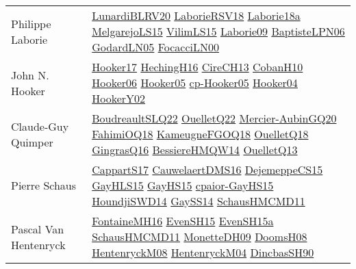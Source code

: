 {\begin{longtable}{p{4cm}p{20cm}}
Philippe Laborie & \href{articles/LunardiBLRV20.pdf}{LunardiBLRV20}\cite{LunardiBLRV20} \href{articles/LaborieRSV18.pdf}{LaborieRSV18}\cite{LaborieRSV18} \href{papers/Laborie18a.pdf}{Laborie18a}\cite{Laborie18a} \href{papers/MelgarejoLS15.pdf}{MelgarejoLS15}\cite{MelgarejoLS15} \href{papers/VilimLS15.pdf}{VilimLS15}\cite{VilimLS15} \href{papers/Laborie09.pdf}{Laborie09}\cite{Laborie09} \href{}{BaptisteLPN06}\cite{BaptisteLPN06} \href{}{GodardLN05}\cite{GodardLN05} \href{papers/FocacciLN00.pdf}{FocacciLN00}\cite{FocacciLN00} \\
John N. Hooker & \href{papers/Hooker17.pdf}{Hooker17}\cite{Hooker17} \href{papers/HechingH16.pdf}{HechingH16}\cite{HechingH16} \href{papers/CireCH13.pdf}{CireCH13}\cite{CireCH13} \href{papers/CobanH10.pdf}{CobanH10}\cite{CobanH10} \href{articles/Hooker06.pdf}{Hooker06}\cite{Hooker06} \href{articles/Hooker05.pdf}{Hooker05}\cite{Hooker05} \href{papers/cp-Hooker05.pdf}{cp-Hooker05}\cite{cp-Hooker05} \href{papers/Hooker04.pdf}{Hooker04}\cite{Hooker04} \href{papers/HookerY02.pdf}{HookerY02}\cite{HookerY02} \\
Claude{-}Guy Quimper & \href{papers/BoudreaultSLQ22.pdf}{BoudreaultSLQ22}\cite{BoudreaultSLQ22} \href{papers/OuelletQ22.pdf}{OuelletQ22}\cite{OuelletQ22} \href{papers/Mercier-AubinGQ20.pdf}{Mercier-AubinGQ20}\cite{Mercier-AubinGQ20} \href{articles/FahimiOQ18.pdf}{FahimiOQ18}\cite{FahimiOQ18} \href{papers/KameugneFGOQ18.pdf}{KameugneFGOQ18}\cite{KameugneFGOQ18} \href{papers/OuelletQ18.pdf}{OuelletQ18}\cite{OuelletQ18} \href{papers/GingrasQ16.pdf}{GingrasQ16}\cite{GingrasQ16} \href{papers/BessiereHMQW14.pdf}{BessiereHMQW14}\cite{BessiereHMQW14} \href{papers/OuelletQ13.pdf}{OuelletQ13}\cite{OuelletQ13} \\
Pierre Schaus & \href{papers/CappartS17.pdf}{CappartS17}\cite{CappartS17} \href{papers/CauwelaertDMS16.pdf}{CauwelaertDMS16}\cite{CauwelaertDMS16} \href{papers/DejemeppeCS15.pdf}{DejemeppeCS15}\cite{DejemeppeCS15} \href{papers/GayHLS15.pdf}{GayHLS15}\cite{GayHLS15} \href{papers/GayHS15.pdf}{GayHS15}\cite{GayHS15} \href{papers/cpaior-GayHS15.pdf}{cpaior-GayHS15}\cite{cpaior-GayHS15} \href{papers/HoundjiSWD14.pdf}{HoundjiSWD14}\cite{HoundjiSWD14} \href{papers/GaySS14.pdf}{GaySS14}\cite{GaySS14} \href{articles/SchausHMCMD11.pdf}{SchausHMCMD11}\cite{SchausHMCMD11} \\
Pascal Van Hentenryck & \href{papers/FontaineMH16.pdf}{FontaineMH16}\cite{FontaineMH16} \href{papers/EvenSH15.pdf}{EvenSH15}\cite{EvenSH15} \href{articles/EvenSH15a.pdf}{EvenSH15a}\cite{EvenSH15a} \href{articles/SchausHMCMD11.pdf}{SchausHMCMD11}\cite{SchausHMCMD11} \href{papers/MonetteDH09.pdf}{MonetteDH09}\cite{MonetteDH09} \href{papers/DoomsH08.pdf}{DoomsH08}\cite{DoomsH08} \href{papers/HentenryckM08.pdf}{HentenryckM08}\cite{HentenryckM08} \href{papers/HentenryckM04.pdf}{HentenryckM04}\cite{HentenryckM04} \href{articles/DincbasSH90.pdf}{DincbasSH90}\cite{DincbasSH90} \\

\end{longtable}}
